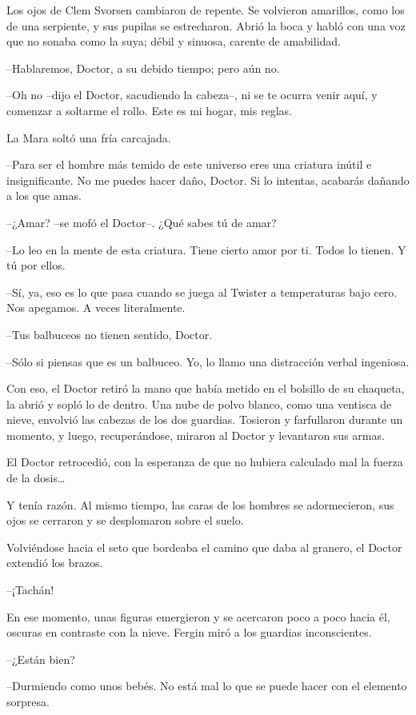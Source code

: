 Los ojos de Clem Svorsen cambiaron de repente. Se volvieron amarillos, como los de una serpiente, y sus pupilas se estrecharon. Abrió la boca y habló con una voz que no sonaba como la suya; débil y sinuosa, carente de amabilidad.

--Hablaremos, Doctor, a su debido tiempo; pero aún no.

--Oh no --dijo el Doctor, sacudiendo la cabeza--, ni se te ocurra venir aquí, y comenzar a soltarme el rollo. Este es mi hogar, mis reglas.

La Mara soltó una fría carcajada.

--Para ser el hombre más temido de este universo eres una criatura inútil e insignificante. No me puedes hacer daño, Doctor. Si lo intentas, acabarás dañando a los que amas.

--¿Amar? --se mofó el Doctor--. ¿Qué sabes tú de amar?

--Lo leo en la mente de esta criatura. Tiene cierto amor por ti. Todos lo tienen. Y tú por ellos.

--Sí, ya, eso es lo que pasa cuando se juega al Twister a temperaturas bajo cero. Nos apegamos. A veces literalmente.

--Tus balbuceos no tienen sentido, Doctor.

--Sólo si piensas que es un balbuceo. Yo, lo llamo una distracción verbal ingeniosa.

Con eso, el Doctor retiró la mano que había metido en el bolsillo de su chaqueta, la abrió y sopló lo de dentro. Una nube de polvo blanco, como una ventisca de nieve, envolvió las cabezas de los dos guardias. Tosieron y farfullaron durante un momento, y luego, recuperándose, miraron al Doctor y levantaron sus armas.

El Doctor retrocedió, con la esperanza de que no hubiera calculado mal la fuerza de la dosis…

Y tenía razón. Al mismo tiempo, las caras de los hombres se adormecieron, sus ojos se cerraron y se desplomaron sobre el suelo.

Volviéndose hacia el seto que bordeaba el camino que daba al granero, el Doctor extendió los brazos.

--¡Tachán!

En ese momento, unas figuras emergieron y se acercaron poco a poco hacia él, oscuras en contraste con la nieve. Fergin miró a los guardias inconscientes.

--¿Están bien?

--Durmiendo como unos bebés. No está mal lo que se puede hacer con el elemento sorpresa.

